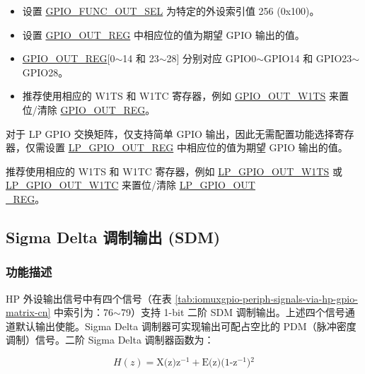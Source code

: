 \documentclass[main\_\_CN.tex]{subfiles}
\begin{document}
\begin{itemize}
    \item 设置 \hyperref[fielddesc:GPIOFUNCNOUTSEL]{GPIO\_FUNC\_OUT\_SEL} 为特定的外设索引值 256 (0x100)。
    \item 设置 \hyperref[regdesc:GPIOOUTREG]{GPIO\_OUT\_REG} 中相应位的值为期望 GPIO 输出的值。
\end{itemize}
\begin{tiplisting}
\vspace{-2em}
\begin{itemize}

\item \hyperref[regdesc:GPIOOUTREG]{GPIO\_OUT\_REG}[0$\sim$14 和 23$\sim$28] 分别对应 GPIO0$\sim$GPIO14 和 GPIO23$\sim$GPIO28。
\item 推荐使用相应的 W1TS 和 W1TC 寄存器，例如 \hyperref[fielddesc:GPIOOUTW1TS]{GPIO\_OUT\_W1TS} 来置位/清除 \hyperref[regdesc:GPIOOUTREG]{GPIO\_OUT\_REG}。
\end{itemize}
\end{tiplisting}
对于 LP GPIO 交换矩阵，仅支持简单 GPIO 输出，因此无需配置功能选择寄存器，仅需设置 \hyperref[regdesc:LPGPIOOUTREG]{LP\_GPIO\_OUT\_REG} 中相应位的值为期望 GPIO 输出的值。

\begin{tiplisting}
推荐使用相应的 W1TS 和 W1TC 寄存器，例如 \hyperref[fielddesc:LPGPIOOUTW1TS]{LP\_GPIO\_OUT\_W1TS} 或 \hyperref[fielddesc:LPGPIOOUTW1TC]{LP\_GPIO\_OUT\_W1TC} 来置位/清除 \hyperref[regdesc:LPGPIOOUTREG]{LP\_GPIO\_OUT\\\_REG}。
\end{tiplisting}

\subsection{Sigma Delta 调制输出 (SDM)}

\subsubsection{功能描述}

HP 外设输出信号中有四个信号（在表 \ref{tab:iomuxgpio-periph-signals-via-hp-gpio-matrix-cn} 中索引为：76$\sim$79）支持 1-bit 二阶 SDM 调制输出。上述四个信号通道默认输出使能。Sigma Delta 调制器可实现输出可配占空比的 PDM（脉冲密度调制）信号。二阶 Sigma Delta 调制器函数为：

\[
    H(z)=\textrm{X(z)z$^{-1}$} + \textrm{E(z)(1-z$^{-1}$)$^{2}$}
    \]
\end{document}
